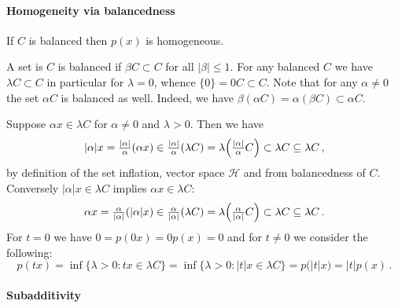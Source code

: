 \documentclass[a4paper]{article}
\newcommand{\Hcal}{\mathcal{H}}
\begin{document}

\paragraph{Homogeneity via balancedness} %
\label{par:homogeneity_via_balancedness}

If $C$ is balanced then $p(x)$ is homogeneous.

A set is $C$ is balanced if $\beta C \subset C$ for all $\lvert \beta \rvert \leq 1$.
For any balanced $C$ we have $\lambda C \subset C$ in particular for $\lambda = 0$,
whence $\{0\} = 0 C \subset C$. Note that for any $\alpha \neq 0$ the set $\alpha C$
is balanced as well. Indeed, we have $\beta (\alpha C) = \alpha (\beta C) \subset
\alpha C$.

Suppose $\alpha x \in \lambda C$ for $\alpha \neq 0$ and $\lambda > 0$. Then we have
\begin{equation*}
  \lvert \alpha \rvert x
    = \tfrac{\lvert \alpha \rvert}\alpha (\alpha x)
    \in \tfrac{\lvert \alpha \rvert}\alpha (\lambda C)
    = \lambda \Bigl( \tfrac{\lvert \alpha \rvert}\alpha C \Bigr)
    \subset \lambda C
    \subseteq \lambda C
    \,,
\end{equation*}
by definition of the set inflation, vector space $\Hcal$ and from balancedness of
$C$. Conversely $\lvert \alpha \rvert x \in \lambda C$ implies $\alpha x \in \lambda
C$:
\begin{equation*}
  \alpha x
    = \tfrac\alpha{\lvert \alpha \rvert} (\lvert \alpha \rvert x)
    \in \tfrac\alpha{\lvert \alpha \rvert} (\lambda C)
    = \lambda \Bigl( \tfrac\alpha{\lvert \alpha \rvert} C \Bigr)
    \subset \lambda C
    \subseteq \lambda C
    \,.
\end{equation*}
For $t = 0$ we have $0 = p(0 x) = 0 p(x) = 0$ and for $t\neq 0$ we consider the
following:
\begin{equation*}
  p(t x)
    = \inf\{\lambda > 0\colon t x \in \lambda C\}
    = \inf\{\lambda > 0\colon \lvert t \rvert x \in \lambda C\}
    = p\bigl( \lvert t \rvert x \bigr) = \lvert t \rvert p(x)
    \,.
\end{equation*}


\paragraph{Subadditivity} %
\label{par:subadditivity}
\end{document}
